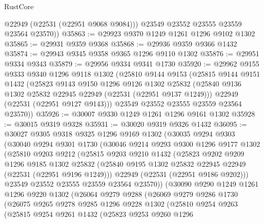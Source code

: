 \begin{lexlean}{RustCore}
\begin{coremodule}
          @22949
          (@22531 (@22951 @9068 @9084)))
        @23549
        @23552
        @23555
        @23559
        @23564
        @23570))
@35863 := @29923 @9370 @1249 @1261 @1296 @9102 @1302
@35865 := @29931 @9359 @9368
@35868 := @29936 @9359 @9366 @1432
@35874 := @29943 @9345 @9358 @9365 @1296 @9110 @1302
@35876 := @29951 @9334 @9343
@35879 := @29956 @9334 @9341 @1730
@35920 := @29962
    @9155
    @9333
    @9340
    @1296
    @9118
    @1302
    (@25810
      @9144
      @9153
      (@25815
        @9144
        @9151
        @1432
        (@25823
          @9143
          @9150
          @1296
          @9126
          @1302
          @25832
          (@25840 @9136 @1302 @25832 @22945 @22949 (@22531 (@22951 @9137 @1249)))
          @22949
          (@22531 (@22951 @9127 @9143)))
        @23549
        @23552
        @23555
        @23559
        @23564
        @23570))
@35926 := @30007 @9330 @1249 @1261 @1296 @9161 @1302
@35928 := @30015 @9319 @9328
@35931 := @30020 @9319 @9326 @1432
@36095 := @30027
    @9305
    @9318
    @9325
    @1296
    @9169
    @1302
    (@30035
      @9294
      @9303
      (@30040
        @9294
        @9301
        @1730
        (@30046
          @9214
          @9293
          @9300
          @1296
          @9177
          @1302
          (@25810
            @9203
            @9212
            (@25815
              @9203
              @9210
              @1432
              (@25823
                @9202
                @9209
                @1296
                @9185
                @1302
                @25832
                (@25840 @9195 @1302 @25832 @22945 @22949 (@22531 (@22951 @9196 @1249)))
                @22949
                (@22531 (@22951 @9186 @9202)))
              @23549
              @23552
              @23555
              @23559
              @23564
              @23570))
          (@30090
            @9290
            @1249
            @1261
            @1296
            @9220
            @1302
            (@26064
              @9279
              @9288
              (@26069
                @9279
                @9286
                @1730
                (@26075
                  @9265
                  @9278
                  @9285
                  @1296
                  @9228
                  @1302
                  (@25810
                    @9254
                    @9263
                    (@25815
                      @9254
                      @9261
                      @1432
                      (@25823
                        @9253
                        @9260
                        @1296

\end{coremodule}
\end{lexlean}

